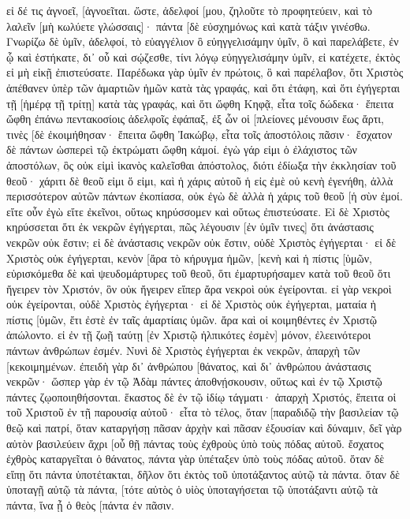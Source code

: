 εἰ δέ τις ἀγνοεῖ, [ἀγνοεῖται. 
ὥστε, ἀδελφοί [μου, ζηλοῦτε τὸ προφητεύειν, καὶ τὸ λαλεῖν [μὴ κωλύετε γλώσσαις]· 
πάντα [δὲ εὐσχημόνως καὶ κατὰ τάξιν γινέσθω. 
Γνωρίζω δὲ ὑμῖν, ἀδελφοί, τὸ εὐαγγέλιον ὃ εὐηγγελισάμην ὑμῖν, ὃ καὶ παρελάβετε, ἐν ᾧ καὶ ἑστήκατε, 
δι᾽ οὗ καὶ σῴζεσθε, τίνι λόγῳ εὐηγγελισάμην ὑμῖν, εἰ κατέχετε, ἐκτὸς εἰ μὴ εἰκῇ ἐπιστεύσατε. 
Παρέδωκα γὰρ ὑμῖν ἐν πρώτοις, ὃ καὶ παρέλαβον, ὅτι Χριστὸς ἀπέθανεν ὑπὲρ τῶν ἁμαρτιῶν ἡμῶν κατὰ τὰς γραφάς, 
καὶ ὅτι ἐτάφη, καὶ ὅτι ἐγήγερται τῇ [ἡμέρᾳ τῇ τρίτῃ] κατὰ τὰς γραφάς, 
καὶ ὅτι ὤφθη Κηφᾷ, εἶτα τοῖς δώδεκα· 
ἔπειτα ὤφθη ἐπάνω πεντακοσίοις ἀδελφοῖς ἐφάπαξ, ἐξ ὧν οἱ [πλείονες μένουσιν ἕως ἄρτι, τινὲς [δὲ ἐκοιμήθησαν· 
ἔπειτα ὤφθη Ἰακώβῳ, εἶτα τοῖς ἀποστόλοις πᾶσιν· 
ἔσχατον δὲ πάντων ὡσπερεὶ τῷ ἐκτρώματι ὤφθη κἀμοί. 
ἐγὼ γάρ εἰμι ὁ ἐλάχιστος τῶν ἀποστόλων, ὃς οὐκ εἰμὶ ἱκανὸς καλεῖσθαι ἀπόστολος, διότι ἐδίωξα τὴν ἐκκλησίαν τοῦ θεοῦ· 
χάριτι δὲ θεοῦ εἰμι ὅ εἰμι, καὶ ἡ χάρις αὐτοῦ ἡ εἰς ἐμὲ οὐ κενὴ ἐγενήθη, ἀλλὰ περισσότερον αὐτῶν πάντων ἐκοπίασα, οὐκ ἐγὼ δὲ ἀλλὰ ἡ χάρις τοῦ θεοῦ [ἡ σὺν ἐμοί. 
εἴτε οὖν ἐγὼ εἴτε ἐκεῖνοι, οὕτως κηρύσσομεν καὶ οὕτως ἐπιστεύσατε. 
Εἰ δὲ Χριστὸς κηρύσσεται ὅτι ἐκ νεκρῶν ἐγήγερται, πῶς λέγουσιν [ἐν ὑμῖν τινες] ὅτι ἀνάστασις νεκρῶν οὐκ ἔστιν; 
εἰ δὲ ἀνάστασις νεκρῶν οὐκ ἔστιν, οὐδὲ Χριστὸς ἐγήγερται· 
εἰ δὲ Χριστὸς οὐκ ἐγήγερται, κενὸν [ἄρα τὸ κήρυγμα ἡμῶν, [κενὴ καὶ ἡ πίστις [ὑμῶν, 
εὑρισκόμεθα δὲ καὶ ψευδομάρτυρες τοῦ θεοῦ, ὅτι ἐμαρτυρήσαμεν κατὰ τοῦ θεοῦ ὅτι ἤγειρεν τὸν Χριστόν, ὃν οὐκ ἤγειρεν εἴπερ ἄρα νεκροὶ οὐκ ἐγείρονται. 
εἰ γὰρ νεκροὶ οὐκ ἐγείρονται, οὐδὲ Χριστὸς ἐγήγερται· 
εἰ δὲ Χριστὸς οὐκ ἐγήγερται, ματαία ἡ πίστις [ὑμῶν, ἔτι ἐστὲ ἐν ταῖς ἁμαρτίαις ὑμῶν. 
ἄρα καὶ οἱ κοιμηθέντες ἐν Χριστῷ ἀπώλοντο. 
εἰ ἐν τῇ ζωῇ ταύτῃ [ἐν Χριστῷ ἠλπικότες ἐσμὲν] μόνον, ἐλεεινότεροι πάντων ἀνθρώπων ἐσμέν. 
Νυνὶ δὲ Χριστὸς ἐγήγερται ἐκ νεκρῶν, ἀπαρχὴ τῶν [κεκοιμημένων. 
ἐπειδὴ γὰρ δι᾽ ἀνθρώπου [θάνατος, καὶ δι᾽ ἀνθρώπου ἀνάστασις νεκρῶν· 
ὥσπερ γὰρ ἐν τῷ Ἀδὰμ πάντες ἀποθνῄσκουσιν, οὕτως καὶ ἐν τῷ Χριστῷ πάντες ζῳοποιηθήσονται. 
ἕκαστος δὲ ἐν τῷ ἰδίῳ τάγματι· ἀπαρχὴ Χριστός, ἔπειτα οἱ τοῦ Χριστοῦ ἐν τῇ παρουσίᾳ αὐτοῦ· 
εἶτα τὸ τέλος, ὅταν [παραδιδῷ τὴν βασιλείαν τῷ θεῷ καὶ πατρί, ὅταν καταργήσῃ πᾶσαν ἀρχὴν καὶ πᾶσαν ἐξουσίαν καὶ δύναμιν, 
δεῖ γὰρ αὐτὸν βασιλεύειν ἄχρι [οὗ θῇ πάντας τοὺς ἐχθροὺς ὑπὸ τοὺς πόδας αὐτοῦ. 
ἔσχατος ἐχθρὸς καταργεῖται ὁ θάνατος, 
πάντα γὰρ ὑπέταξεν ὑπὸ τοὺς πόδας αὐτοῦ. ὅταν δὲ εἴπῃ ὅτι πάντα ὑποτέτακται, δῆλον ὅτι ἐκτὸς τοῦ ὑποτάξαντος αὐτῷ τὰ πάντα. 
ὅταν δὲ ὑποταγῇ αὐτῷ τὰ πάντα, [τότε αὐτὸς ὁ υἱὸς ὑποταγήσεται τῷ ὑποτάξαντι αὐτῷ τὰ πάντα, ἵνα ᾖ ὁ θεὸς [πάντα ἐν πᾶσιν. 
